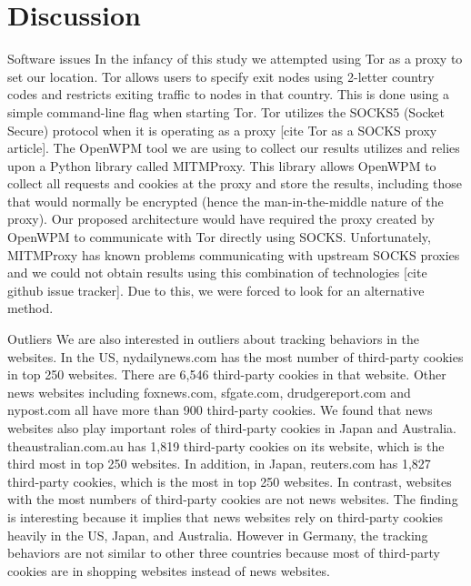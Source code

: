 \documentclass[journal]{IEEEtran}
\begin{document}
\section{Discussion}
Software issues
In the infancy of this study we attempted using Tor as a proxy to set our location. Tor allows users to specify exit nodes using 2-letter country codes and restricts exiting traffic to nodes in that country. This is done using a simple command-line flag when starting Tor. Tor utilizes the SOCKS5 (Socket Secure) protocol when it is operating as a proxy [cite Tor as a SOCKS proxy article]. The OpenWPM tool we are using to collect our results utilizes and relies upon a Python library called MITMProxy. This library allows OpenWPM to collect all requests and cookies at the proxy and store the results, including those that would normally be encrypted (hence the man-in-the-middle nature of the proxy). Our proposed architecture would have required the proxy created by OpenWPM to communicate with Tor directly using SOCKS. Unfortunately, MITMProxy has known problems communicating with upstream SOCKS proxies and we could not obtain results using this combination of technologies [cite github issue tracker]. Due to this, we were forced to look for an alternative method.

Outliers
We are also interested in outliers about tracking behaviors in the websites. In the US, nydailynews.com has the most number of third-party cookies in top 250 websites. There are 6,546 third-party cookies in that website. Other news websites including foxnews.com, sfgate.com, drudgereport.com and nypost.com all have more than 900 third-party cookies. We found that news websites also play important roles of third-party cookies in Japan and Australia. theaustralian.com.au has 1,819 third-party cookies on its website, which is the third most in top 250 websites. In addition, in Japan, reuters.com has 1,827 third-party cookies, which is the most in top 250 websites.  In contrast, websites with the most numbers of third-party cookies are not news websites. The finding is interesting because it implies that news websites rely on third-party cookies heavily in the US, Japan, and Australia. However in Germany, the tracking behaviors are not similar to other three countries because most of third-party cookies are in shopping websites instead of news websites.  
\end{document}
